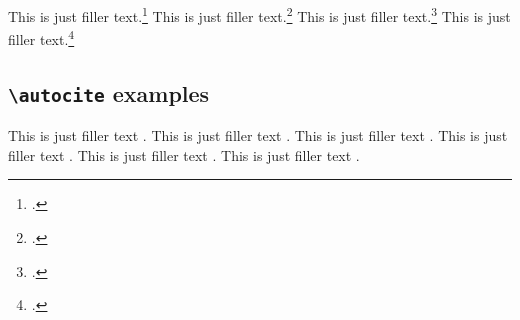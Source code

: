 \documentclass[a4paper]{article}
\newcommand*{\cmd}[1]{\texttt{\textbackslash #1}}
\begin{document}
\clearpage


This is just filler text.\footcite{kant:kpv}
This is just filler text.\footcite{kant:ku}
This is just filler text.\footcite[24]{kant:kpv}
This is just filler text.\footcite[59--63]{kant:ku}

\clearpage

\subsection*{\cmd{autocite} examples}


This is just filler text \autocite{aristotle:rhetoric}.
This is just filler text \autocite{averroes/bland}.
This is just filler text \autocite{aristotle:rhetoric}.
This is just filler text \autocite{aristotle:anima}.
This is just filler text \autocite{aristotle:physics}.
This is just filler text \autocite{aristotle:physics}.

\clearpage


\printshorthands
\printbibliography
\end{document}

